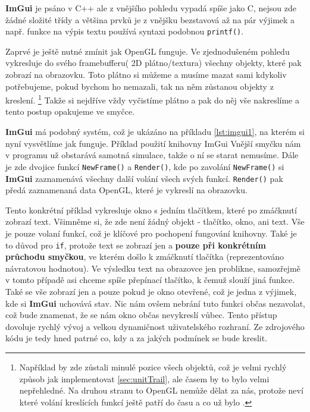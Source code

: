 \textbf{ImGui} je psáno v C++ ale z vnějšího pohledu vypadá spíše jako C, nejsou zde žádné složité třídy a většina prvků je z vnějšku bezstavová až na pár výjimek a např. funkce na výpis textu používá syntaxi podobnou \texttt{printf()}.

Zaprvé je ještě nutné zmínit jak OpenGL funguje. Ve zjednodušeném pohledu vykresluje do svého framebufferu( 2D plátno/textura) všechny objekty, které pak zobrazí na obrazovku. Toto plátno si můžeme a musíme mazat sami kdykoliv potřebujeme, pokud bychom ho nemazali, tak na něm zůstanou objekty z  kreslení.
\footnote{Například by zde zůstali minulé pozice všech objektů, což je velmi rychlý způsob jak implementovat \ref{sec:unitTrail}, ale časem by to bylo velmi nepřehledné. Na druhou stranu to OpenGL nemůže dělat za nás, protože neví které volání kreslících funkcí ještě patří do  času a co už bylo .} Takže si nejdříve vždy vyčistíme plátno a pak do něj vše nakreslíme a tento postup opakujeme ve smyčce.

\textbf{ImGui} má podobný systém, což je ukázáno na příkladu \ref{lst:imgui1}, na kterém si nyní vysvětlíme jak funguje.
{Příklad použití knihovny ImGui }
Vnější smyčku nám v programu už obstarává samotná simulace, takže o ní se starat nemusíme. Dále je zde dvojice funkcí \texttt{NewFrame()} a \texttt{Render()}, kde po zavolání \texttt{NewFrame()} si \textbf{ImGui} zaznamenává všechny další volání všech svých funkcí. \texttt{Render()} pak předá zaznamenaná data OpenGL, které je vykreslí na obrazovku. 

Tento konkrétní příklad vykresluje okno s jedním tlačítkem, které po zmáčknutí zobrazí text. Všimněme si, že zde není žádný objekt - tlačítko, okno, ani text. Vše je pouze volaní funkcí, což je klíčové pro pochopení fungování knihovny. Také je to důvod pro \texttt{if}, protože  text se zobrazí jen a \textbf{pouze při konkrétním průchodu smyčkou}, ve kterém došlo k zmáčknutí tlačítka (reprezentováno návratovou hodnotou). Ve výsledku text na obrazovce jen problikne, samozřejmě v tomto případě asi chceme spíše přepínací tlačítko, k čemuž slouží jiná funkce. Také se vše zobrazí jen a pouze pokud je okno otevřené, což je jedna z výjimek, kde si \textbf{ImGui} uchovává stav. Nic nám ovšem nebrání tuto funkci občas nezavolat, což bude znamenat, že se nám okno občas nevykreslí vůbec. Tento přístup dovoluje rychlý vývoj a velkou dynamičnost uživatelského rozhraní. Ze zdrojového kódu je tedy hned patrné co, kdy a za jakých podmínek se bude kreslit.

